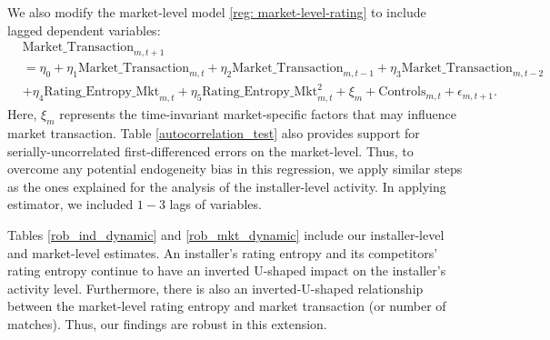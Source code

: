 \documentclass[msom,blindrev]{informs3}
\begin{document}
We also modify the market-level model \eqref{reg: market-level-rating} to include lagged dependent variables:
	\begin{align} \nonumber
	&\text{Market\_Transaction}_{m,t+1}\\ \nonumber
	& =\eta_{0}+ \eta_{1} \text{Market\_Transaction}_{m,t}+ \eta_{2} \text{Market\_Transaction}_{m,t-1} + \eta_{3} \text{Market\_Transaction}_{m,t-2} \\ \label{eq: ext_market_level}
	&+ \eta_{4} \text{Rating\_Entropy\_Mkt}_{m,t}+ \eta_{5}\text{Rating\_Entropy\_Mkt}_{m,t} ^2 + \xi_{m}+ \text{Controls}_{m,t}  +\epsilon_{m,t+1}.
	\end{align}
	Here, $\xi_{m}$ represents the time-invariant market-specific factors that may influence market transaction.  Table \ref{autocorrelation_test} also provides support for serially-uncorrelated first-differenced errors on the market-level. Thus, to overcome any potential endogeneity bias in this regression, we apply similar steps as the ones explained for the analysis of the installer-level activity. In applying  \cite{arellano1991some} estimator, we included $1-3$ lags of variables.
	
	Tables \ref{rob_ind_dynamic} and \ref{rob_mkt_dynamic} include our installer-level and market-level estimates. An installer's rating entropy and its competitors' rating entropy continue to have an inverted U-shaped impact on the installer's activity level. Furthermore, there is also an inverted-U-shaped relationship between the market-level rating entropy and market transaction (or number of matches).  Thus, our findings are robust in this extension.
	
	
	
	
\end{document}

